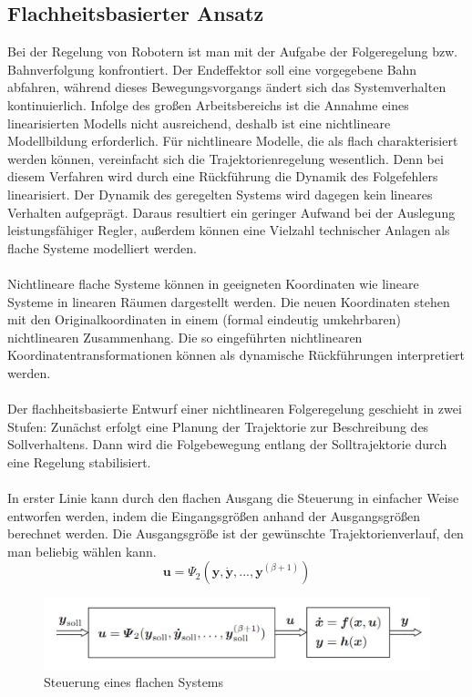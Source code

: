 	\subsection{Flachheitsbasierter Ansatz}
		Bei der Regelung von Robotern ist man mit der Aufgabe der Folgeregelung bzw. Bahnverfolgung konfrontiert. Der Endeffektor soll eine vorgegebene Bahn abfahren, während	dieses Bewegungsvorgangs ändert sich das Systemverhalten kontinuierlich. Infolge des großen
		Arbeitsbereichs ist die Annahme eines linearisierten Modells nicht ausreichend, deshalb ist eine nichtlineare Modellbildung erforderlich. Für nichtlineare Modelle, die als flach charakterisiert	werden können, vereinfacht sich die Trajektorienregelung wesentlich. Denn bei diesem Verfahren wird durch eine Rückführung die Dynamik des Folgefehlers linearisiert. Der Dynamik des geregelten Systems wird dagegen kein lineares Verhalten aufgeprägt. Daraus resultiert ein geringer Aufwand bei der Auslegung leistungsfähiger Regler, außerdem können eine Vielzahl technischer Anlagen als flache Systeme modelliert werden.\\\\
		Nichtlineare flache Systeme können in geeigneten Koordinaten wie lineare Systeme in linearen Räumen dargestellt werden.  Die neuen Koordinaten stehen mit den Originalkoordinaten in einem (formal eindeutig umkehrbaren) nichtlinearen Zusammenhang. Die so eingeführten nichtlinearen
		Koordinatentransformationen können als dynamische Rückführungen interpretiert werden. \\\\	
		Der flachheitsbasierte Entwurf einer nichtlinearen Folgeregelung geschieht in zwei Stufen: Zunächst erfolgt eine Planung der Trajektorie zur Beschreibung des Sollverhaltens. Dann wird die Folgebewegung entlang der Solltrajektorie durch eine Regelung stabilisiert.\\\\
		In erster Linie kann durch den flachen Ausgang die Steuerung in einfacher Weise entworfen werden, indem die Eingangsgrößen anhand der Ausgangsgrößen berechnet werden. Die Ausgangsgröße ist der gewünschte Trajektorienverlauf, den man beliebig wählen kann. 
		\[\bm{u} =\bm{\varPsi}_{2}(\bm{y,\dot{y},...,y}^{(\beta+1)}) \]
		\begin{figure}[h]
			\centering
			\includegraphics[width=0.6\linewidth]{./pics/re/steuerung}
			\caption{Steuerung eines flachen Systems}
			\label{}
		\end{figure}
